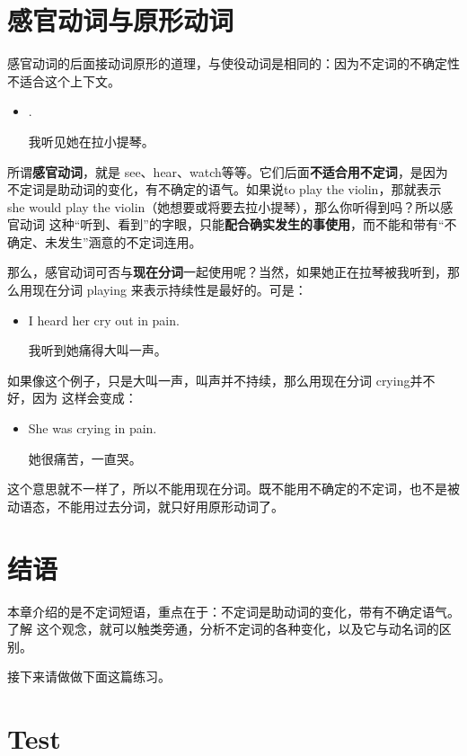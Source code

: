 \section{感官动词与原形动词}

感官动词的后面接动词原形的道理，与使役动词是相同的：因为不定词的不确定性不适合这个上下文。

\begin{itemize}
\item {}   .

  我听见她在拉小提琴。
\end{itemize}

所谓\textbf{感官动词}，就是 see、hear、watch等等。它们后面\textbf{不适合用不定词}，是因为
不定词是助动词的变化，有不确定的语气。如果说to play the violin，那就表示 she
would play the violin（她想要或将要去拉小提琴），那么你听得到吗？所以感官动词
这种“听到、看到”的字眼，只能\textbf{配合确实发生的事使用}，而不能和带有“不
确定、未发生”涵意的不定词连用。

那么，感官动词可否与\textbf{现在分词}一起使用呢？当然，如果她正在拉琴被我听到，那么用现在分词
playing 来表示持续性是最好的。可是：
\begin{itemize}
\item  I heard her cry out in pain.

  我听到她痛得大叫一声。
\end{itemize}

如果像这个例子，只是大叫一声，叫声并不持续，那么用现在分词 crying并不好，因为
这样会变成：
\begin{itemize}
\item She was crying in pain.

  她很痛苦，一直哭。
\end{itemize}
这个意思就不一样了，所以不能用现在分词。既不能用不确定的不定词，也不是被动语态，不能用过去分词，就只好用原形动词了。

\section{结语}

本章介绍的是不定词短语，重点在于：不定词是助动词的变化，带有不确定语气。了解
这个观念，就可以触类旁通，分析不定词的各种变化，以及它与动名词的区别。

接下来请做做下面这篇练习。

\section{Test}

